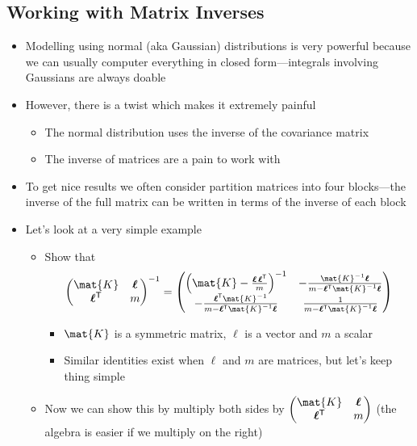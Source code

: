 \documentclass[11pt]{article}
\newcommand{\tr}{\textsf{T}}
\newcommand{\vl}{\bm{\ell}}
\begin{document}
\subsection{Working with Matrix Inverses}
\label{sec:org6b35c2c}
\begin{itemize}
\item Modelling using normal (aka Gaussian) distributions is very
powerful because we can usually computer everything in closed
form---integrals involving Gaussians are always doable
\item However, there is a twist which makes it extremely painful
\begin{itemize}
\item The normal distribution uses the inverse of the covariance matrix
\item The inverse of matrices are a pain to work with
\end{itemize}
\item To get nice results we often consider partition matrices into
four blocks---the inverse of the full matrix can be written in
terms of the inverse of each block
\item Let's look at a very simple example
\begin{itemize}
\item Show that
$$ \begin{pmatrix} \mat{K} & \vl \\ \vl^\tr & m \end{pmatrix}^{-1} 
       =  \begin{pmatrix} \left(\mat{K}-\frac{\vl\,\vl^\tr}{m}\right)^{-1}  &
            -\frac{\mat{K}^{-1} \vl}{m-\vl^\tr \mat{K}^{-1}\vl}  \\ 
	    -\frac{\vl^\tr\mat{K}^{-1}}{m-\vl^\tr \mat{K}^{-1}\vl} &
	    \frac{1}{m-\vl^\tr \mat{K}^{-1}\vl} 
       \end{pmatrix} $$
\begin{itemize}
\item \(\mat{K}\) is a symmetric matrix, \(\ell\) is a vector and \(m\) a
scalar
\item Similar identities exist when \(\ell\) and \(m\) are matrices,
but let's keep thing simple
\end{itemize}
\item Now we can show this by multiply both sides by \(\begin{pmatrix}
       \mat{K} & \vl \\ \vl^\tr & m \end{pmatrix}\) (the algebra is
easier if we multiply on the right)

\end{itemize}
\end{itemize}
\end{document}
